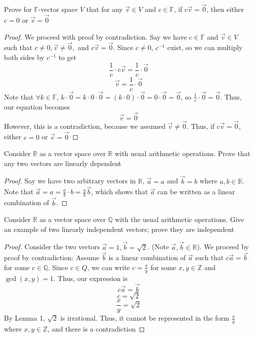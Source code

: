 \documentclass[11pt]{article}
\newcommand{\Z}{\mathbb{Z}}
\newcommand{\Q}{\mathbb{Q}}
\newcommand{\R}{\mathbb{R}}
\newcommand{\F}{\mathbb{F}}
\begin{document}
\begin{problem}[Problem 3]
Prove for $\F$-vector space $V$ that for any $\vec{v} \in V$ and $c\in\F$, if $c\vec{v} = \vec{0}$, then either $c=0$ or $\vec{v} = \vec{0}$
\end{problem}

\begin{proof}
We proceed with proof by contradiction. Say we have $c\in\F$ and $\vec{v}\in V$ such that $c\neq 0, \vec{v}\neq \vec{0},$ and $c\vec{v} = \vec{0}$. Since $c\neq 0$, $c^{-1}$ exist, so we can multiply both sides by $c^{-1}$ to get
$$\frac{1}{c} \cdot c\vec{v} = \frac{1}{c}\cdot \vec{0} $$
$$\vec{v} = \frac{1}{c}\cdot \vec{0} $$
Note that $\forall k\in \F$, $k\cdot \vec{0} = k \cdot 0 \cdot \vec{0} = (k\cdot 0)\cdot \vec{0} = 0\cdot \vec{0} = \vec{0}$, so $\frac{1}{c}\cdot \vec{0} = \vec{0}$. Thus, our equation becomes 
$$\vec{v} = \vec{0} $$
However, this is a contradiction, because we assumed $\vec{v}\neq \vec{0}$. Thus, if $c\vec{v} = \vec{0}$, either $c=0$ or $\vec{v}=\vec{0}$
\end{proof}

\begin{problem}[Problem 4A]
    Consider $\R$ as a vector space over $\R$ with usual arithmetic operations. Prove that any two vectors are linearly dependent
\end{problem}

\begin{proof}
Say we have two arbitrary vectors in $\R$, $\vec{a} = a$ and $\vec{b} = b$ where $a, b \in \R$. Note that $\vec{a} = a = \frac{a}{b} \cdot b = \frac{a}{b} \vec{b}$, which shows that $\vec{a}$ can be written as a linear combination of $\vec{b}$. 
\end{proof}

\begin{problem}[Problem 4B]
    Consider $\R$ as a vector space over $\Q$ with the usual arithmetic operations. Give an example of two linearly independent vectors; prove they are independent
\end{problem}
\begin{proof}
    Consider the two vectors $\vec{a} = 1, \vec{b} = \sqrt{2}$. (Note $\vec{a}, \vec{b} \in \R$). We proceed by proof by contradiction: Assume $\vec{b}$ is a linear combination of $\vec{a}$ such that $c\vec{a} = \vec{b}$ for some $c\in \Q$. Since $c \in Q$, we can write $c=\frac{x}{y}$ for some $x, y \in \Z$ and $\gcd(x, y) = 1$. Thus, our expression is 
    $$c\vec{a} = \vec{b}$$
    $$c = \sqrt{2}$$
    $$\frac{x}{y} = \sqrt{2}$$
By Lemma 1, $\sqrt{2}$ is irrational. Thus, it cannot be represented in the form $\frac{x}{y}$ where $x, y \in \Z$, and there is a contradiction
\end{proof}
\end{document}
